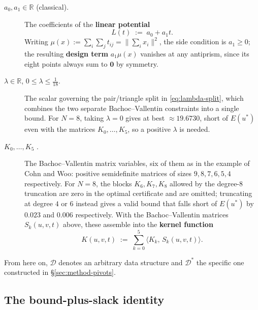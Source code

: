 \documentclass[11pt]{article}
\theoremstyle{definition}
\theoremstyle{remark}
\newcommand{\RR}{\mathbb{R}}
\newcommand{\energy}{E}
\begin{document}
\begin{description}
\item[$a_0,a_1\in\RR$ (classical).] The coefficients of the
  \textbf{linear potential}
  \begin{equation}
    L(t) \;:=\; a_0 + a_1 t.
  \end{equation}
  Writing $\mu(x):=\sum_i\sum_j t_{ij}=\lVert\sum_i x_i\rVert^2$, the
  side condition is $a_1\ge0$; the resulting \textbf{design term}
  $a_1\mu(x)$ vanishes at any antiprism, since
  its eight points always sum to $\mathbf{0}$ by symmetry.

\item[$\lambda\in\RR$, $0\le\lambda\le\tfrac1{18}$.] The
  scalar governing the pair/triangle split in \eqref{eq:lambda-split},
  which combines the two separate Bachoc--Vallentin constraints into a
  single bound. For $N=8$, taking $\lambda=0$ gives at
  best $\approx19.6730$, short of $\energy(u^*)$ even with the matrices
  $K_0,\ldots,K_5$, so a positive $\lambda$ is needed.

\item[$K_0,\dots,K_5$ \cite{BV08,CW12}.] The Bachoc--Vallentin
  matrix variables, six of them as in the example of Cohn and Woo: positive
  semidefinite matrices of sizes $9,8,7,6,5,4$ respectively. For $N=8$,
  the blocks $K_6,K_7,K_8$ allowed by the degree-$8$ truncation are zero
  in the optimal certificate and are omitted; truncating at degree $4$ or
  $6$ instead gives a valid bound that falls short of $\energy(u^*)$ by
  $0.023$ and $0.006$ respectively. With the Bachoc--Vallentin matrices
  $S_k(u,v,t)$ above, these assemble into the \textbf{kernel function}
  \begin{equation}
    K(u,v,t) \;:=\; \sum_{k=0}^{5} \langle K_k,\, S_k(u,v,t) \rangle.
  \end{equation}
\end{description}

From here on, $\mathcal{D}$ denotes an arbitrary data structure and
$\mathcal{D}^*$ the specific one constructed in
\S\ref{sec:method-pivots}.

\subsection{The bound-plus-slack identity}
\label{sec:method-terms}
\label{sec:method-identity}
\end{document}
